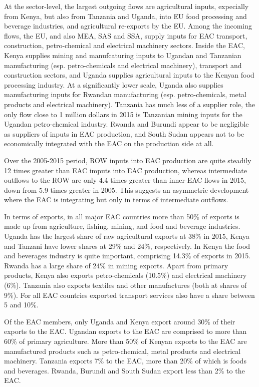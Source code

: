 \documentclass[a4paper]{article}
\begin{document}
At the sector-level, the largest outgoing flows are agricultural inputs, expecially from Kenya, but also from Tanzania and Uganda, into EU food processing and beverage industries, and agricultural re-exports by the EU. Among the incoming flows, the EU, and also MEA, SAS and SSA, supply inputs for EAC transport, construction, petro-chemical and electrical machinery sectors. Inside the EAC, Kenya supplies mining and manufcaturing inputs to Ugandan and Tanzanian manufacturing (esp. petro-chemicals and electrical machinery), transport and construction sectors, and Uganda supplies agricultural inputs to the Kenyan food processing industry.  At a significantly lower scale, Uganda also supplies manufacturing inputs for Rwandan manufacturing (esp. petro-chemicals, metal products and electrical machinery). Tanzania has much less of a supplier role, the only flow close to 1 million dollars in 2015 is Tanzanian mining inputs for the Ugandan petro-chemical industry. Rwanda and Burundi appear to be negligible as suppliers of inputs in EAC production, and South Sudan appears not to be economically integrated with the EAC on the production side at all. \newline

Over the 2005-2015 period, ROW inputs into EAC production are quite steadily 12 times greater than EAC imputs into EAC production, whereas intermediate outflows to the ROW are only 4.4 times greater  than inner-EAC flows in 2015, down from 5.9 times greater in 2005. This suggests an asymmetric development where the EAC is integrating but only in terms of intermediate outflows. \newline

In terms of exports, in all major EAC countries more than 50\% of exports is made up from agriculture, fishing, mining, and food and beverage industries. Uganda has the largest share of raw agricultural exports at 38\% in 2015, Kenya and Tanzani have lower shares at 29\% and 24\%, respectively. In Kenya the food and beverages industry is quite important, comprising 14.3\% of exports in 2015. Rwanda has a large share of 24\% in mining exports. Apart from primary products, Kenya also exports petro-chemicals (10.5\%) and electrical machinery (6\%). Tanzania also exports textiles and other manufactures (both at shares of 9\%). For all EAC countries exported transport services also have a share between 5 and 10\%. \newline

Of the EAC members, only Uganda and Kenya export around 30\% of their exports to the EAC. Ugandan exports to the EAC are comprised to more than 60\% of primary agriculture. More than 50\% of Kenyan exports to the EAC are manufactured products such as petro-chemical, metal products and electrical machinery. Tanzania exports 7\% to the EAC, more than 20\% of which is foods and beverages. Rwanda, Burundi and South Sudan export less than 2\% to the EAC.  \newline 
\end{document}
